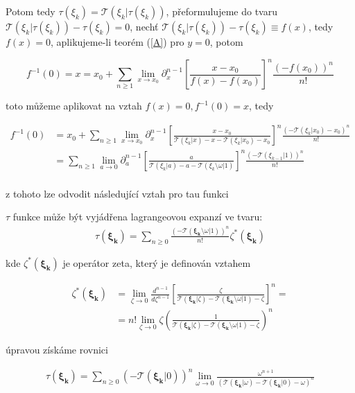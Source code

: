  Potom tedy \(\tau(\xi_k) = \mathcal{T}(\xi_k | \tau(\xi_k))\), 
 přeformulujeme do tvaru \(\mathcal{T}(\xi_k | \tau(\xi_k)) - 
 \tau(\xi_k) = 0\), nechť \(\mathcal{T}(\xi_k | \tau(\xi_k)) -
 \tau(\xi_k) \equiv f(x)\), tedy \(f(x) = 0\), aplikujeme-li 
 teorém (\ref{A}) pro \(y = 0\), potom
 
 \begin{equation}
      f^{-1}(0) = x = x_0 + \sum_{n \geq 1}\lim_{x \to x_0}
      \partial_x^{n-1}\left[ \frac{x - x_0}{f(x) -
      f(x_0)}\right]^n \frac{(-f(x_0))^n}{n!}
\end{equation}

toto můžeme aplikovat na vztah \(f(x) = 0, f^{-1}(0) = x\), tedy

\begin{align}
      f^{-1}(0) &= x_0 + \sum_{n \geq 1}\lim_{x \to x_0}
      \partial_x^{n-1}\left[ \frac{x - x_0}{\mathcal{T}(\xi_k
      | x) - x - \mathcal{T}(\xi_k | x_0) - x_0} \right]^n 
      \frac{(-\mathcal{T}(\xi_k | x_0) - x_0)^n}{n!} \\
      &= \sum_{n \geq 1}\lim_{a \to 0} \partial_{a}^{n-1}\left[
      \frac{a}{\mathcal{T}(\xi_k | a) - a - \mathcal{T}(\xi_{k}
      \setminus \omega | 1)} \right]^n \frac{(-\mathcal{T}(\xi_{k-1} | 1))^n}{n!} \\
\end{align}

z tohoto lze odvodit následující vztah pro tau funkci

\begin{corollary}
      \(\tau\) funkce může být vyjádřena lagrangeovou expanzí ve tvaru:
      \begin{align}
            \tau(\boldsymbol{\xi_k}) = \sum_{n \geq 0} 
            \frac{(-\mathcal{T}(\boldsymbol{\xi_k} \setminus
            \omega |1))^n}{n!}\zeta^*(\boldsymbol{\xi_k})
      \end{align}
      
      kde \(\zeta^*(\boldsymbol{\xi_k})\) je operátor 
      zeta, který je definován vztahem
            
      \begin{align}
            \zeta^*({\boldsymbol{\xi_k}}) &= \lim_{\zeta \to
            0}\frac{d^{n-1}}{d\zeta^{n-1}} \left[ \frac{\zeta}{
            \mathcal{T}(\boldsymbol{\xi_k} | \zeta) - \mathcal{T}(
            \boldsymbol{\xi_k}\setminus \omega | 1) -\zeta} \right]^n
            =\\ &= n!\lim_{\zeta \to 0} \zeta \left( \frac{1}{\mathcal{T}(
            \boldsymbol{\xi_k} |\zeta) - \mathcal{T}(\boldsymbol{\xi_k} 
            \setminus \omega|1) - \zeta} \right)^n
      \end{align}
      
      úpravou získáme rovnici
      
      \begin{align}
            \tau(\boldsymbol{\xi_k})= \sum_{n \geq 0} (-\mathcal{T}(
            \boldsymbol{\xi_k} | 0))^n\lim_{\omega \to 0} \frac{\omega^{n+1}}{(
            \mathcal{T}(\boldsymbol{\xi_k} |\omega) - \mathcal{T}(\boldsymbol{
            \xi_k} | 0) - \omega)^n}
      \end{align}
\end{corollary}

